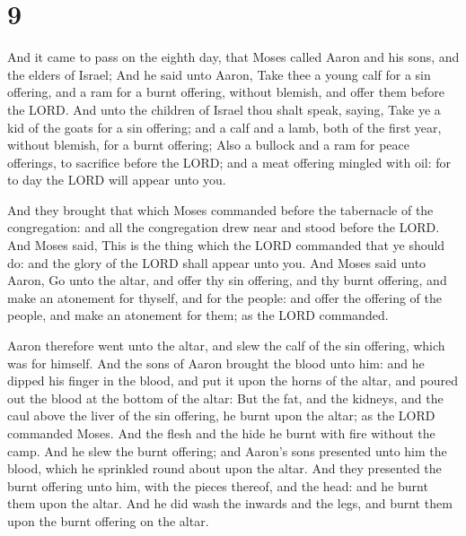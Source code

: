 \hypertarget{section-8}{%
\section{9}\label{section-8}}

 And it came to pass on the eighth day, that Moses called
Aaron and his sons, and the elders of Israel;  And he said
unto Aaron, Take thee a young calf for a sin offering, and a ram for a
burnt offering, without blemish, and offer them before the LORD.
 And unto the children of Israel thou shalt speak, saying,
Take ye a kid of the goats for a sin offering; and a calf and a lamb,
both of the first year, without blemish, for a burnt offering;
 Also a bullock and a ram for peace offerings, to sacrifice
before the LORD; and a meat offering mingled with oil: for to day the
LORD will appear unto you.

 And they brought that which Moses commanded before the
tabernacle of the congregation: and all the congregation drew near and
stood before the LORD.  And Moses said, This is the thing
which the LORD commanded that ye should do: and the glory of the LORD
shall appear unto you.  And Moses said unto Aaron, Go unto
the altar, and offer thy sin offering, and thy burnt offering, and make
an atonement for thyself, and for the people: and offer the offering of
the people, and make an atonement for them; as the LORD commanded.

 Aaron therefore went unto the altar, and slew the calf of
the sin offering, which was for himself.  And the sons of
Aaron brought the blood unto him: and he dipped his finger in the blood,
and put it upon the horns of the altar, and poured out the blood at the
bottom of the altar:  But the fat, and the kidneys, and the
caul above the liver of the sin offering, he burnt upon the altar; as
the LORD commanded Moses.  And the flesh and the hide he
burnt with fire without the camp.  And he slew the burnt
offering; and Aaron's sons presented unto him the blood, which he
sprinkled round about upon the altar.  And they presented
the burnt offering unto him, with the pieces thereof, and the head: and
he burnt them upon the altar.  And he did wash the inwards
and the legs, and burnt them upon the burnt offering on the altar.

